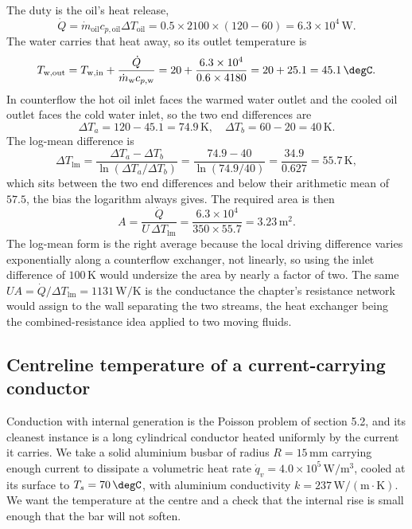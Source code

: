 The duty is the oil's heat release,
\[
\dot{Q} = \dot{m}_{\text{oil}} c_{p,\text{oil}} \Delta T_{\text{oil}} =
0.5 \times 2100 \times (120 - 60) = 6.3 \times 10^4\,\text{W}.
\]
The water carries that heat away, so its outlet temperature is
\[
T_{\text{w,out}} = T_{\text{w,in}} + \frac{\dot{Q}}{\dot{m}_{\text{w}}
c_{p,\text{w}}} = 20 + \frac{6.3 \times 10^4}{0.6 \times 4180} = 20 +
25.1 = 45.1\,\degC.
\]
In counterflow the hot oil inlet faces the warmed water outlet and the
cooled oil outlet faces the cold water inlet, so the two end differences
are
\[
\Delta T_a = 120 - 45.1 = 74.9\,\si{\kelvin}, \quad \Delta T_b = 60 - 20 =
40\,\si{\kelvin}.
\]
The log-mean difference is
\[
\Delta T_{\text{lm}} = \frac{\Delta T_a - \Delta T_b}{\ln(\Delta T_a/
\Delta T_b)} = \frac{74.9 - 40}{\ln(74.9/40)} = \frac{34.9}{0.627} =
55.7\,\si{\kelvin},
\]
which sits between the two end differences and below their arithmetic mean
of $57.5$, the bias the logarithm always gives. The required area is then
\[
A = \frac{\dot{Q}}{U\,\Delta T_{\text{lm}}} = \frac{6.3 \times 10^4}{350
\times 55.7} = 3.23\,\text{m}^2.
\]
The log-mean form is the right average because the local driving
difference varies exponentially along a counterflow exchanger, not
linearly, so using the inlet difference of $100\,\si{\kelvin}$ would
undersize the area by nearly a factor of two. The same $UA = \dot{Q}/
\Delta T_{\text{lm}} = 1131\,\text{W}/\si{\kelvin}$ is the conductance the
chapter's resistance network would assign to the wall separating the two
streams, the heat exchanger being the combined-resistance idea applied to
two moving fluids.

\subsection{Centreline temperature of a current-carrying conductor}

Conduction with internal generation is the Poisson problem of section 5.2, and
its cleanest instance is a long cylindrical conductor heated uniformly by the
current it carries. We take a solid aluminium busbar of radius $R =
15\,\si{\milli\meter}$ carrying enough current to dissipate a volumetric heat
rate $\dot{q}_v = 4.0 \times 10^{5}\,\text{W}/\text{m}^3$, cooled at its surface
to $T_s = 70\,\degC$, with aluminium conductivity $k = 237\,\text{W}/(\text{m}
\cdot\si{\kelvin})$. We want the temperature at the centre and a check that the
internal rise is small enough that the bar will not soften.

